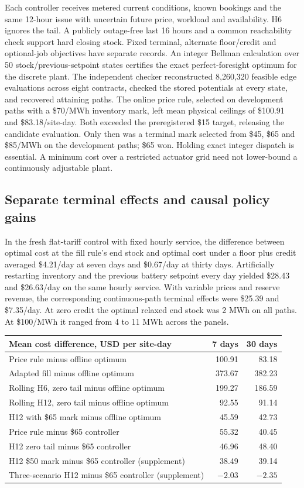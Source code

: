 \documentclass[10pt,letterpaper]{article}
\begin{document}
Each controller receives metered current conditions, known bookings and the same 12-hour issue with uncertain future price, workload and availability. H6 ignores the tail. A publicly outage-free last 16 hours and a common reachability check support hard closing stock. Fixed terminal, alternate floor/credit and optional-job objectives have separate records. An integer Bellman calculation over 50 stock/previous-setpoint states certifies the exact perfect-foresight optimum for the discrete plant. The independent checker reconstructed 8,260,320 feasible edge evaluations across eight contracts, checked the stored potentials at every state, and recovered attaining paths. The online price rule, selected on development paths with a \$70/MWh inventory mark, left mean physical ceilings of \$100.91 and \$83.18/site-day. Both exceeded the preregistered \$15 target, releasing the candidate evaluation. Only then was a terminal mark selected from \$45, \$65 and \$85/MWh on the development paths; \$65 won. Holding exact integer dispatch is essential. A minimum cost over a restricted actuator grid need not lower-bound a continuously adjustable plant.

\subsection{Separate terminal effects and causal policy gains}
In the fresh flat-tariff control with fixed hourly service, the difference between optimal cost at the fill rule's end stock and optimal cost under a floor plus credit averaged \$4.21/day at seven days and \$0.67/day at thirty days. Artificially restarting inventory and the previous battery setpoint every day yielded \$28.43 and \$26.63/day on the same hourly service. With variable prices and reserve revenue, the corresponding continuous-path terminal effects were \$25.39 and \$7.35/day. At zero credit the optimal relaxed end stock was 2 MWh on all paths. At \$100/MWh it ranged from 4 to 11 MWh across the panels.

\begin{center}\small
\begin{tabular}{lrr}
\hline
Mean cost difference, USD per site-day & 7 days & 30 days\\\hline
Price rule minus offline optimum & 100.91 & 83.18\\
Adapted fill minus offline optimum & 373.67 & 382.23\\
Rolling H6, zero tail minus offline optimum & 199.27 & 186.59\\
Rolling H12, zero tail minus offline optimum & 92.55 & 91.14\\
H12 with \$65 mark minus offline optimum & 45.59 & 42.73\\\hline
Price rule minus \$65 controller & 55.32 & 40.45\\
H12 zero tail minus \$65 controller & 46.96 & 48.40\\
H12 \$50 mark minus \$65 controller (supplement) & 38.49 & 39.14\\
Three-scenario H12 minus \$65 controller (supplement) & $-2.03$ & $-2.35$\\\hline
\end{tabular}
\end{center}
\end{document}
